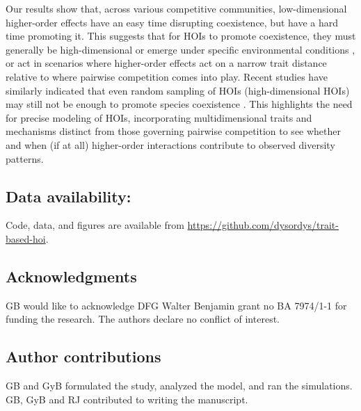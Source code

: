 \documentclass[11pt]{article}
\begin{document}
Our results show that, across various competitive communities, low-dimensional higher-order effects have an easy time disrupting coexistence, but have a hard time promoting it. This suggests that for HOIs to promote coexistence, they must generally be high-dimensional or emerge under specific environmental conditions \citep{fox_existence_2023}, or act in scenarios where higher-order effects act on a narrow trait distance relative to where pairwise competition comes into play. Recent studies have similarly indicated that even random sampling of HOIs (high-dimensional HOIs) may still not be enough to promote species coexistence \citep{gibbs_when_2024}. This highlights the need for precise modeling of HOIs, incorporating multidimensional traits and mechanisms distinct from those governing pairwise competition to see whether and when (if at all) higher-order interactions contribute to observed diversity patterns.


\subsection*{Data availability:} 
Code, data, and figures are available from \url{https://github.com/dysordys/trait-based-hoi}.%

\subsection*{Acknowledgments}
GB would like to acknowledge DFG Walter Benjamin grant no BA 7974/1-1 for funding the research. The authors declare no conflict of interest.

\subsection*{Author contributions}
GB and GyB formulated the study, analyzed the model, and ran the simulations. GB, GyB and RJ contributed to writing the manuscript.
\end{document}
